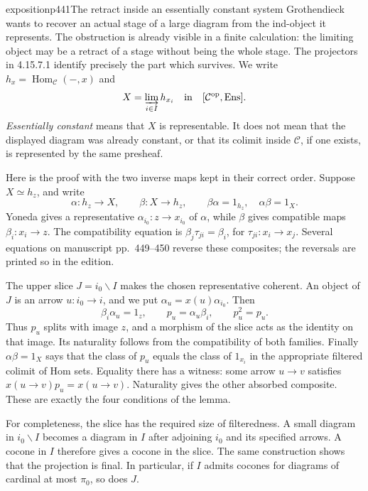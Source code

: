 \begin{dcomment}{exposition}{p441}{The retract inside an essentially constant system}
Grothendieck wants to recover an actual stage of a large diagram from the ind-object it represents. The obstruction is already visible in a finite calculation: the limiting object may be a retract of a stage without being the whole stage. The projectors in 4.15.7.1 identify precisely the part which survives. We write $h_x=\operatorname{Hom}_{\mathcal C}(-,x)$ and
\[
X=\varinjlim_{i\in I}h_{x_i}
\quad\hbox{in}\quad [\mathcal C^{\mathrm{op}},\mathrm{Ens}].
\]
\emph{Essentially constant} means that $X$ is representable. It does not mean that the displayed diagram was already constant, or that its colimit inside $\mathcal C$, if one exists, is represented by the same presheaf.

Here is the proof with the two inverse maps kept in their correct order. Suppose $X\simeq h_z$, and write
\[
\alpha:h_z\longrightarrow X,\qquad
\beta:X\longrightarrow h_z,\qquad
\beta\alpha=1_{h_z},\quad\alpha\beta=1_X.
\]
Yoneda gives a representative $\alpha_{i_0}:z\to x_{i_0}$ of $\alpha$, while $\beta$ gives compatible maps $\beta_i:x_i\to z$. The compatibility equation is
$\beta_j\tau_{ji}=\beta_i$, for $\tau_{ji}:x_i\to x_j$.
Several equations on manuscript pp.~449--450 reverse these composites; the reversals are printed so in the edition.

The upper slice $J=i_0\backslash I$ makes the chosen representative coherent. An object of $J$ is an arrow $u:i_0\to i$, and we put $\alpha_u=x(u)\alpha_{i_0}$. Then
\[
\beta_i\alpha_u=1_z,\qquad p_u=\alpha_u\beta_i,\qquad p_u^2=p_u.
\]
Thus $p_u$ splits with image $z$, and a morphism of the slice acts as the identity on that image. Its naturality follows from the compatibility of both families. Finally $\alpha\beta=1_X$ says that the class of $p_u$ equals the class of $1_{x_i}$ in the appropriate filtered colimit of Hom sets. Equality there has a witness: some arrow $u\to v$ satisfies $x(u\to v)p_u=x(u\to v)$. Naturality gives the other absorbed composite. These are exactly the four conditions of the lemma.

For completeness, the slice has the required size of filteredness. A small diagram in $i_0\backslash I$ becomes a diagram in $I$ after adjoining $i_0$ and its specified arrows. A cocone in $I$ therefore gives a cocone in the slice. The same construction shows that the projection is final. In particular, if $I$ admits cocones for diagrams of cardinal at most $\pi_0$, so does $J$.


\end{dcomment}
